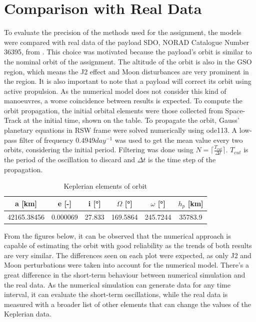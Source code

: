 \section{Comparison with Real Data}
\label{sec:comparison}

To evaluate the precision of the methods used for the assignment, the models were compared with real data of the payload SDO, NORAD Catalogue Number 36395, from \cite{space_track} \cite{n2yo}. This choice was motivated because the payload’s orbit is similar to the nominal orbit of the assignment. The altitude of the orbit is also in the GSO region, which means the J2 effect and Moon disturbances are very prominent in the region. It is also important to note that a payload will correct its orbit using active propulsion. As the numerical model does not consider this kind of manoeuvres, a worse coincidence between results is expected. To compute the orbit propagation, the initial orbital elements were those collected from Space-Track at the initial time, shown on the table. To propagate the orbit, Gauss’ planetary equations in RSW frame were solved numerically using ode113. A low-pass filter of frequency $0.4949  day^{-1}$ was used to get the mean value every two orbits, considering the initial period. Filtering was done using \( N = \lceil \frac{T_{cut}}{\Delta t} \rceil \). \( T_{cut} \) is the period of the oscillation to discard and \( \Delta t \) is the time step of the propagation. 


\begin{table}[ht]
	\centering
	\label{tab:keplerian_elements_2}
	\begin{tabular}{|c|c|c|c|c|c|}
		\hline
		a [km] & e [-] & i [°] & $\Omega$ [°] & $\omega$ [°] & $h_p$ [km] \\
		\hline
		42165.38456 & 0.000069 & 27.833 & 169.5864 & 245.7244 & 35783.9 \\
		\hline
	\end{tabular}
	\caption{Keplerian elements of orbit}
\end{table}

From the figures below, it can be observed that the numerical approach is capable of estimating the orbit with good reliability as the trends of both results are very similar. The differences seen on each plot were expected, as only J2 and Moon perturbations were taken into account for the numerical model. There’s a great difference in the short-term behaviour between numerical simulation and the real data. As the numerical simulation can generate data for any time interval, it can evaluate the short-term oscillations, while the real data is measured with a broader list of other elements that can change the values of the Keplerian data.

